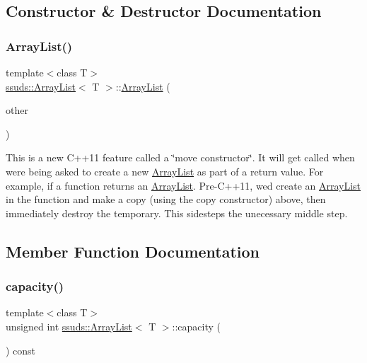 \subsection{Constructor \& Destructor Documentation}
\mbox{\label{classssuds_1_1_array_list_ad351338073d3009c376cc41ebd1a3fa1}} 
\subsubsection{\texorpdfstring{ArrayList()}{ArrayList()}}
{\footnotesize\ttfamily template$<$class T$>$ \\
\mbox{\hyperlink{classssuds_1_1_array_list}{ssuds\+::\+Array\+List}}$<$ T $>$\+::\mbox{\hyperlink{classssuds_1_1_array_list}{Array\+List}} (\begin{DoxyParamCaption}\item[{\mbox{\hyperlink{classssuds_1_1_array_list}{Array\+List}}$<$ T $>$ \&\&}]{other }\end{DoxyParamCaption})\hspace{0.3cm}{\ttfamily [inline]}}

This is a new C++11 feature called a \char`\"{}move constructor\char`\"{}. It will get called when we\textquotesingle{}re being asked to create a new \mbox{\hyperlink{classssuds_1_1_array_list}{Array\+List}} as part of a return value. For example, if a function returns an \mbox{\hyperlink{classssuds_1_1_array_list}{Array\+List}}. Pre-\/\+C++11, we\textquotesingle{}d create an \mbox{\hyperlink{classssuds_1_1_array_list}{Array\+List}} in the function and make a copy (using the copy constructor) above, then immediately destroy the temporary. This sidesteps the unecessary middle step. 

\subsection{Member Function Documentation}
\mbox{\label{classssuds_1_1_array_list_a4e9f0d67b921ddde2da06bdef3012ca8}} 
\subsubsection{\texorpdfstring{capacity()}{capacity()}}
{\footnotesize\ttfamily template$<$class T$>$ \\
unsigned int \mbox{\hyperlink{classssuds_1_1_array_list}{ssuds\+::\+Array\+List}}$<$ T $>$\+::capacity (\begin{DoxyParamCaption}{ }\end{DoxyParamCaption}) const\hspace{0.3cm}{\ttfamily [inline]}}

